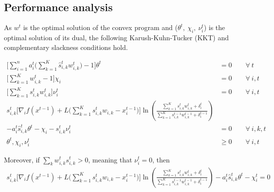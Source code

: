 \subsection{Performance analysis}
As $w^{t}$ is the optimal solution of the convex program and ($\theta^t,\ \chi_{i},\ \nu_{i}^{t}$) is the optimal solution of its dual, the following Karush-Kuhn-Tucker (KKT) and complementary slackness conditions hold.

\begin{align*}
   \biggl[ \sum_{i=1}^{n} a_{i}^{t} \biggl( \sum_{k=1}^{K}  \hat{s}_{i,k}^{t} w_{i,k}^{t} \biggr) - 1 \biggr] \theta^{t} &= 0 \qquad \forall \ t \\
   \biggl[ \sum_{k=1}^{K}  w_{i,k}^{t}  - 1 \biggr] \chi_{i} &= 0 \qquad \forall\ i, t \\
   \biggl[ \sum_{k=1}^{K}  s_{i,k}^{t} w_{i,k}^{t} \biggr] \nu_{i}^{t} &= 0 \qquad \forall\ i, t \\
%
 s_{i,k}^{t} \biggl[  \nabla_{i} f(x^{t-1}) + L\biggl( \sum_{k=1}^{K} s_{i,k}^{t} w_{i,k}  - x_{i}^{t-1} \biggr) \biggr] \ln \left( \frac{\sum_{k=1}^{K} s_{i,k}^{t} w_{i,k}^{t} + \delta_{i}^{t}}{\sum_{k=1}^{K}  s_{i,k}^{t-1}w_{i,k}^{t-1}  + \delta_{i}^{t-1}} \right) \\
        - a_{i}^{t} \hat{s}_{i,k}^{t} \theta^{t} - \chi_{i} - s_{i,k}^{t} \nu_{i}^{t} &= 0	\qquad \forall\ i,k,t \\
    \theta^{t}, \chi_{i}, \nu_{i}^{t} &\geq 0 \qquad \forall\ i, t
\end{align*}

Moreover, if $\sum_{k} w_{i,k}^{t} s_{i,k}^{t} > 0$, meaning that $\nu_{i}^{t} = 0$, then
\begin{align}	\label{eq:KKT2}
 s_{i,k}^{t} \biggl[  \nabla_{i} f(x^{t-1}) + L\biggl( \sum_{k=1}^{K} s_{i,k}^{t} w_{i,k}  - x_{i}^{t-1} \biggr) \biggr] \ln \left( \frac{\sum_{k=1}^{K} s_{i,k}^{t} w_{i,k}^{t} + \delta_{i}^{t}}{\sum_{k=1}^{K}  s_{i,k}^{t-1}w_{i,k}^{t-1}  + \delta_{i}^{t-1}} \right)
        - a_{i}^{t} \hat{s}_{i,k}^{t} \theta^{t} - \chi_{i}^{t} = 0
\end{align}

\clearpage

